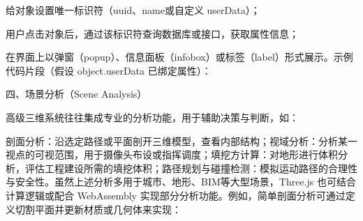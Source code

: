 给对象设置唯一标识符（uuid、name或自定义 userData）；

用户点击对象后，通过该标识符查询数据库或接口，获取属性信息；

在界面上以弹窗（popup）、信息面板（infobox）或标签（label）形式展示。示例代码片段（假设 object.userData 已绑定属性）：

\begin{Shaded}
\begin{Highlighting}[]
 

\OperatorTok{=} \NormalTok{(}\NormalTok{)}\OperatorTok{;}

\OperatorTok{=}\OperatorTok{;}

 \OperatorTok{=} \VerbatimStringTok{\textasciigrave{}}



\VerbatimStringTok{\textasciigrave{}}\OperatorTok{;}

 \OperatorTok{=} \OperatorTok{;}

\NormalTok{\}}
\end{Highlighting}
\end{Shaded}

四、场景分析（Scene Analysis）

高级三维系统往往集成专业的分析功能，用于辅助决策与判断，如：

剖面分析：沿选定路径或平面剖开三维模型，查看内部结构；视域分析：分析某一视点的可视范围，用于摄像头布设或指挥调度；填挖方计算：对地形进行体积分析，评估工程建设所需的填挖体积；路径规划与碰撞检测：模拟运动路径的合理性与安全性。虽然上述分析多用于城市、地形、BIM等大型场景，Three.js 也可结合计算逻辑或配合 WebAssembly 实现部分分析功能。例如，简单剖面分析可通过定义切割平面并更新材质或几何体来实现：

